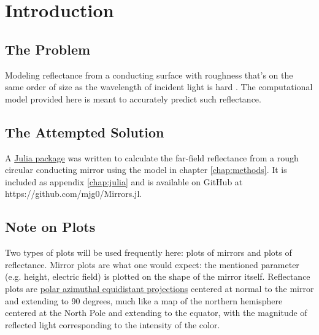 \documentclass[etd,senior,noacknowledgments]{BYUPhys}
\begin{document}
\frontmatter

\makepreliminarypages

\tableofcontents

\mainmatter






\chapter{Introduction} \label{chap:intro}

\section{The Problem} \label{sec:problem}

Modeling reflectance from a conducting surface with roughness that's on the same order of size as the wavelength of incident light is hard \cite{Schroder2011}. The computational model provided here is meant to accurately predict such reflectance.



\section{The Attempted Solution} \label{sec:attempted_solution}

A \href{https://github.com/mjg0/Mirrors.jl}{Julia package} was written to calculate the far-field reflectance from a rough circular conducting mirror using the model in chapter \ref{chap:methods}. It is included as appendix \ref{chap:julia} and is available on GitHub at https://github.com/mjg0/Mirrors.jl.



\section{Note on Plots} \label{sec:plots_note}

Two types of plots will be used frequently here: plots of mirrors and plots of reflectance. Mirror plots are what one would expect: the mentioned parameter (e.g. height, electric field) is plotted on the shape of the mirror itself. Reflectance plots are \href{https://en.wikipedia.org/wiki/Azimuthal_equidistant_projection}{polar azimuthal equidistant projections} centered at normal to the mirror and extending to 90 degrees, much like a map of the northern hemisphere centered at the North Pole and extending to the equator, with the magnitude of reflected light corresponding to the intensity of the color.
\end{document}
